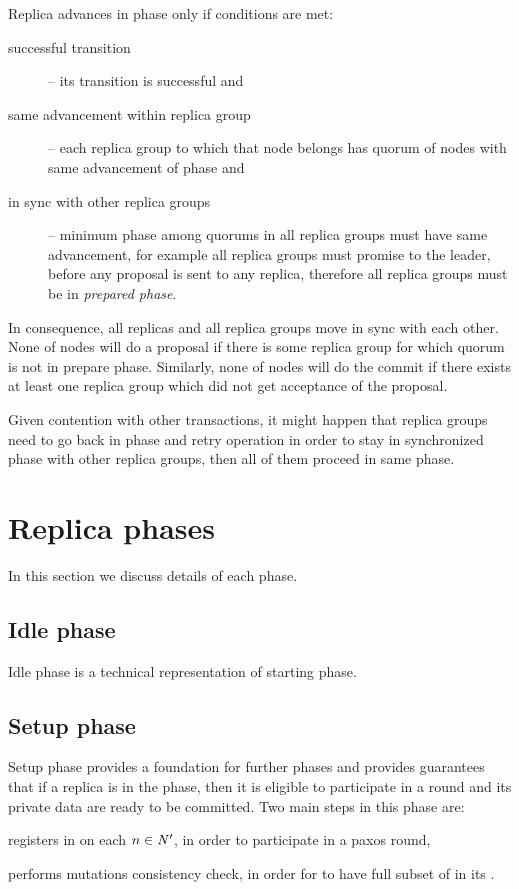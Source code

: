 Replica advances in phase only if conditions are met: \begin{description}
\item[successful transition] -- its transition is successful and
\item[same advancement within replica group] -- each replica group to which that node belongs has quorum of nodes with same advancement of phase and
\item[in sync with other replica groups] -- minimum phase among quorums in all replica groups must have same advancement, for example all replica groups must promise to the leader, before any proposal is sent to any replica, therefore all replica groups must be in \emph{prepared phase}.
\end{description}


In consequence, all replicas and all replica groups move in sync with each other. None of nodes will do a proposal if there is some replica group for which quorum is not in prepare phase. 
Similarly, none of nodes will do the commit if there exists at least one replica group which did not get acceptance of the proposal.  

Given contention with other transactions, it might happen that replica groups need to go back in phase and retry operation in order to stay in synchronized phase with other replica groups, then all of them proceed in same phase.

\section{Replica phases}
In this section we discuss details of each phase.

\subsection{Idle phase}
Idle phase is a technical representation of starting phase.

\subsection{Setup phase}
Setup phase provides a foundation for further phases and provides guarantees that if a replica is in the phase, then it is eligible to participate in a \paxos round and its private data are ready to be committed. Two main steps in this phase are: \begin{enumerate*}[label=\alph*)]
\item \transaction registers in \txIndex on each $n\in \text{$\mathit{N'}$}$, in order to participate in a paxos round,
\item \transaction performs mutations consistency check, in order for  to have full subset of \mutations in its \txStorage.
\end{enumerate*}


